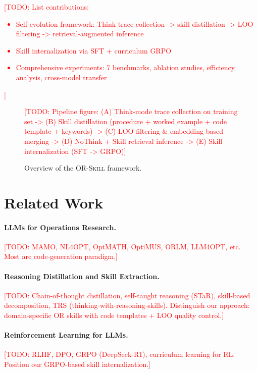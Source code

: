\documentclass[11pt]{article}
\newcommand{\ours}{\textsc{OR-Skill}}
\newcommand{\todo}[1]{\textcolor{red}{[TODO: #1]}}
\begin{document}
\todo{List contributions:
\begin{itemize}
    \item Self-evolution framework: Think trace collection -> skill distillation -> LOO filtering -> retrieval-augmented inference
    \item Skill internalization via SFT + curriculum GRPO
    \item Comprehensive experiments: 7 benchmarks, ablation studies, efficiency analysis, cross-model transfer
\end{itemize}
}

\begin{figure}[t]
\centering
\todo{Pipeline figure: (A) Think-mode trace collection on training set -> (B) Skill distillation (procedure + worked example + code template + keywords) -> (C) LOO filtering \& embedding-based merging -> (D) NoThink + Skill retrieval inference -> (E) Skill internalization (SFT -> GRPO)}
\caption{Overview of the \ours{} framework.}
\label{fig:pipeline}
\end{figure}

\section{Related Work}
\label{sec:related}

\paragraph{LLMs for Operations Research.}
\todo{MAMO, NL4OPT, OptMATH, OptiMUS, ORLM, LLM4OPT, etc. Most are code-generation paradigm.}

\paragraph{Reasoning Distillation and Skill Extraction.}
\todo{Chain-of-thought distillation, self-taught reasoning (STaR), skill-based decomposition, TRS (thinking-with-reasoning-skills). Distinguish our approach: domain-specific OR skills with code templates + LOO quality control.}

\paragraph{Reinforcement Learning for LLMs.}
\todo{RLHF, DPO, GRPO (DeepSeek-R1), curriculum learning for RL. Position our GRPO-based skill internalization.}
\end{document}
